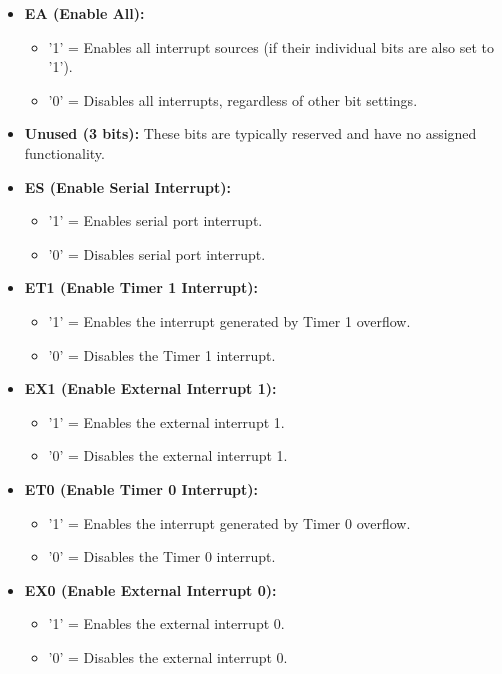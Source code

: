 \documentclass[
]{article}
\begin{document}
\begin{itemize}
\item
  \textbf{EA (Enable All):}

  \begin{itemize}
  \item
    '1' = Enables all interrupt sources (if their individual bits are
    also set to '1').
  \item
    '0' = Disables all interrupts, regardless of other bit settings.
  \end{itemize}
\item
  \textbf{Unused (3 bits):} These bits are typically reserved and have
  no assigned functionality.
\item
  \textbf{ES (Enable Serial Interrupt):}

  \begin{itemize}
  \item
    '1' = Enables serial port interrupt.
  \item
    '0' = Disables serial port interrupt.
  \end{itemize}
\item
  \textbf{ET1 (Enable Timer 1 Interrupt):}

  \begin{itemize}
  \item
    '1' = Enables the interrupt generated by Timer 1 overflow.
  \item
    '0' = Disables the Timer 1 interrupt.
  \end{itemize}
\item
  \textbf{EX1 (Enable External Interrupt 1):}

  \begin{itemize}
  \item
    '1' = Enables the external interrupt 1.
  \item
    '0' = Disables the external interrupt 1.
  \end{itemize}
\item
  \textbf{ET0 (Enable Timer 0 Interrupt):}

  \begin{itemize}
  \item
    '1' = Enables the interrupt generated by Timer 0 overflow.
  \item
    '0' = Disables the Timer 0 interrupt.
  \end{itemize}
\item
  \textbf{EX0 (Enable External Interrupt 0):}

  \begin{itemize}
  \item
    '1' = Enables the external interrupt 0.
  \item
    '0' = Disables the external interrupt 0.
  \end{itemize}
\end{itemize}
\end{document}
